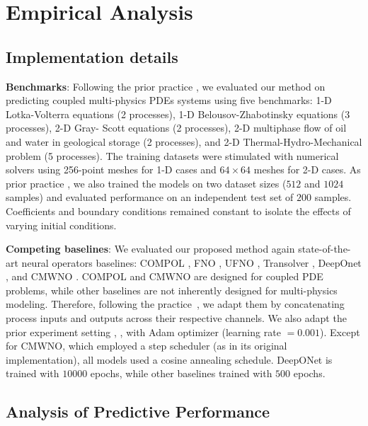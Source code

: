 \documentclass{article}
\begin{document}
\section{Empirical Analysis}
\subsection{Implementation details}
\textbf{Benchmarks}:  Following the prior practice \citep{sun2025compolunifiedneuraloperator}, we evaluated our method on predicting coupled multi-physics PDEs systems using five benchmarks: 1-D Lotka-Volterra equations \citep{Murray2002} (2 processes), 1-D Belousov-Zhabotinsky equations \citep{Petrov1993} (3 processes), 2-D Gray-
Scott equations \citep{Pearson_1993} (2 processes), 2-D multiphase flow of oil and water in geological
storage \citep{bear2010modeling} \citep{hashemi2021pore} \cite{aboukassem2013petroleum} (2 processes), and 2-D Thermal-Hydro-Mechanical problem \citep{Gao2020} (5 processes). The training datasets were stimulated with numerical solvers using 256-point meshes for 1-D cases and $64 \times 64$ meshes for 2-D cases. As prior practice \citep{sun2025compolunifiedneuraloperator}, we also trained the models on two dataset sizes ($512$ and $1024$ samples) and evaluated performance on an independent test set of $200$ samples. Coefficients and boundary
conditions remained constant to isolate the effects of varying initial conditions.

\textbf{Competing baselines}: We evaluated our proposed method again state-of-the-art neural operators baselines: COMPOL \citep{sun2025compolunifiedneuraloperator}, FNO \citep{li2021fourier}, UFNO \citep{wen2022ufnoenhancedfourier}, Transolver \citep{wu2024transolverfasttransformersolver}, DeepOnet \citep{lu2021learning}, and CMWNO \citep{xiao2023coupled}. COMPOL and CMWNO are designed for coupled PDE problems, while other baselines are not inherently designed for multi-physics modeling. Therefore, following the practice~\cite{sun2025compolunifiedneuraloperator}, we adapt them by concatenating process inputs and outputs across their respective channels. We also adapt the prior experiment setting \citep{sun2025compolunifiedneuraloperator}, \cite{xiao2023coupled}, with Adam optimizer (learning rate $=0.001$). Except for CMWNO, which employed a step scheduler (as in its original
implementation), all models used a cosine annealing schedule. DeepONet is trained with $10000$ epochs, while other baselines trained with $500$ epochs. 

\subsection{Analysis of Predictive Performance}
\end{document}
